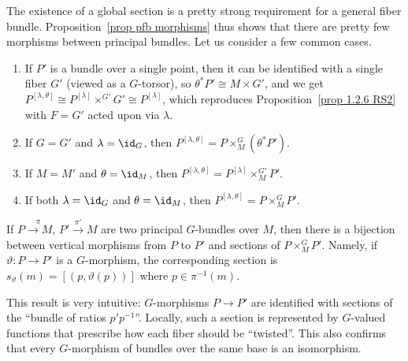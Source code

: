 \begin{example}
    The existence of a global section is a pretty strong requirement for a general fiber bundle. Proposition~\ref{prop pfb morphisms} thus shows that there are pretty few morphisms between principal bundles. Let us consider a few common cases.
    \begin{enumerate}
        \item If $P'$ is a bundle over a single point, then it can be identified with a single fiber $G'$ (viewed as a $G$-torsor), so $\theta^\ast P'\cong M\times G'$, and we get $P^{[\lambda,\theta]}\cong P^{[\lambda]}\times^{G'}G'\cong P^{[\lambda]}$, which reproduces Proposition~\ref{prop 1.2.6 RS2} with $F=G'$ acted upon via $\lambda$.
        \item If $G=G'$ and $\lambda=\id_G$, then $P^{[\lambda,\theta]}=P\times^G_M(\theta^\ast P')$. 
        \item If $M=M'$ and $\theta=\id_M$, then $P^{[\lambda,\theta]}=P^{[\lambda]}\times^{G'}_MP'$. 
        \item If both $\lambda=\id_G$ and $\theta=\id_M$, then $P^{[\lambda,\theta]}=P\times^G_MP'$. 
    \end{enumerate}
\end{example}

\begin{cor}[{{\cite[Cor.~1.2.7]{RS2}}}]\label{cor 1.2.7 RS2}
    If $P\overset{\pi}{\to M}$, $P'\overset{\pi'}{\to}M$ are two principal $G$-bundles over $M$, then there is a bijection between vertical morphisms from $P$ to $P'$ and sections of $P\times^G_MP'$. Namely, if $\vartheta:P\to P'$ is a $G$-morphism, the corresponding section is $s_\vartheta(m)=[(p,\vartheta(p))]$ where $p\in\pi^{-1}(m)$.
\end{cor}
This result is very intuitive: $G$-morphisms $P\to P'$ are identified with sections of the ``bundle of ratios $p'p^{-1}$''. Locally, such a section is represented by $G$-valued functions that prescribe how each fiber should be ``twisted''. This also confirms that every $G$-morphism of bundles over the same base is an isomorphism.

